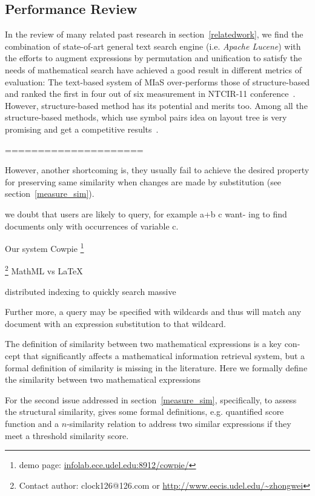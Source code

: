 \subsection{Performance Review}
In the review of many related past research in section~\ref{relatedwork}, we find the combination of state-of-art general text search engine (i.e. \textit{Apache Lucene}) with the efforts to augment expressions by permutation and unification to satisfy the needs of mathematical search have achieved a good result in different metrics of evaluation: 
The text-based system of MIaS over-performs those of structure-based and ranked the first in four out of six measurement in NTCIR-11 conference~\cite{NTCIR11res}. 
However, structure-based method has its potential and merits too. 
Among all the structure-based methods, \cite{symbolpairs15,symbolpair15:2} which use symbol pairs idea on layout tree is very promising and get a competitive results~\cite{NTCIR11res}.

\pagebreak
=====================

However, another shortcoming is, they usually fail to achieve the desired property for preserving same similarity when changes are made by substitution (see section~\ref{measure_sim}).

we doubt that users are likely to query, for example a+b c want-
ing to find documents only with occurrences of variable c.

Our system Cowpie \footnote{demo page: \url{infolab.ece.udel.edu:8912/cowpie/}}

\let\thefootnote\relax\footnote{Contact author: clock126@126.com or
\url{http://www.eecis.udel.edu/~zhongwei}}
MathML vs LaTeX

distributed indexing to quickly search massive

Further more, a query may be specified with wildcards and thus will match any document with an expression substitution to that wildcard. 

The definition of similarity between two mathematical expressions is a key con-
cept that significantly affects a mathematical information retrieval system, but
a formal definition of similarity is missing in the literature. Here we formally
define the similarity between two mathematical expressions

For the second issue addressed in section~\ref{measure_sim}, specifically, to assess the structural similarity, \cite{improving09} gives some formal definitions, e.g. quantified score function and a \mbox{$n$-similarity} relation to address two similar expressions if they meet a threshold similarity score.

